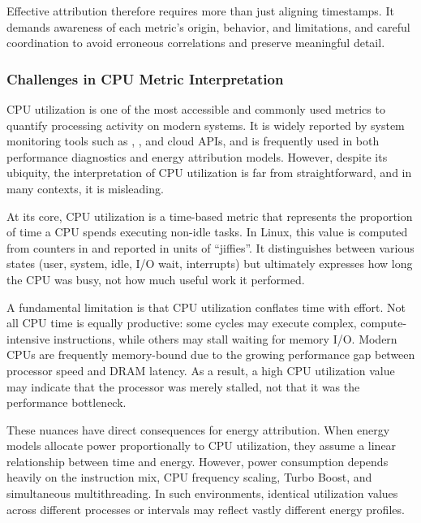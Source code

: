 Effective attribution therefore requires more than just aligning timestamps. It demands awareness of each metric’s origin, behavior, and limitations, and careful coordination to avoid erroneous correlations and preserve meaningful detail.

\subsubsection{Challenges in CPU Metric Interpretation}
\label{sec:cpu-metric-challenges}

CPU utilization is one of the most accessible and commonly used metrics to quantify processing activity on modern systems. It is widely reported by system monitoring tools such as , , and cloud APIs, and is frequently used in both performance diagnostics and energy attribution models. However, despite its ubiquity, the interpretation of CPU utilization is far from straightforward, and in many contexts, it is misleading.

At its core, CPU utilization is a time-based metric that represents the proportion of time a CPU spends executing non-idle tasks. In Linux, this value is computed from counters in  and reported in units of ``jiffies''. It distinguishes between various states (user, system, idle, I/O wait, interrupts) but ultimately expresses how long the CPU was busy, not how much useful work it performed\parencite{Tarara2023CpuUtilization}.

A fundamental limitation is that CPU utilization conflates time with effort. Not all CPU time is equally productive: some cycles may execute complex, compute-intensive instructions, while others may stall waiting for memory I/O. Modern CPUs are frequently memory-bound due to the growing performance gap between processor speed and DRAM latency. As a result, a high CPU utilization value may indicate that the processor was merely stalled, not that it was the performance bottleneck\parencite{Gregg2017CpuUtilizationWrong}.

These nuances have direct consequences for energy attribution. When energy models allocate power proportionally to CPU utilization, they assume a linear relationship between time and energy. However, power consumption depends heavily on the instruction mix, CPU frequency scaling, Turbo Boost, and simultaneous multithreading. In such environments, identical utilization values across different processes or intervals may reflect vastly different energy profiles.

